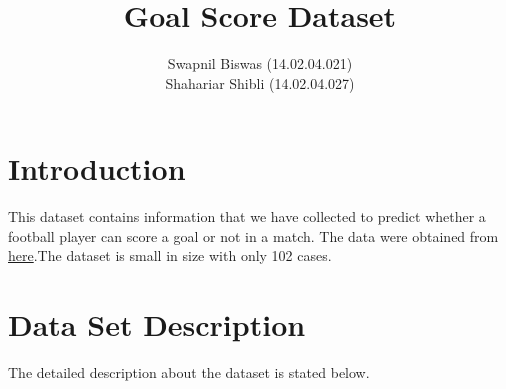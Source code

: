 \documentclass[10pt,a4paper]{article}
\title{\textbf{Goal Score Dataset}}
\author{Swapnil Biswas (14.02.04.021)\\
		Shahariar Shibli (14.02.04.027)\\
		}
\begin{document}
\maketitle

\section{Introduction}
This dataset contains information that we have collected to predict whether a football player can score a goal or not in a match. The data were obtained from \href{https://www.whoscored.com/Statistics}{here}.The dataset is small in size with only 102 cases.

\section{Data Set Description}
The detailed description about the dataset is stated below.
\end{document}
